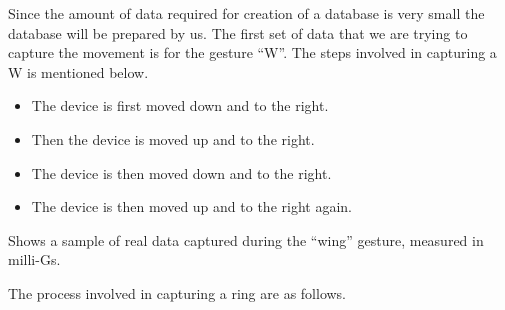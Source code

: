 Since the amount of data required for creation of a database is very small the database will be prepared by us. The first set of data that we are trying to capture the movement is for the gesture ``W''. The steps involved in capturing a W is mentioned below. \cite{Warden:2020}
\vspace{5mm}
\begin{center}
\end{center}
\begin{itemize}
    \item The device is first moved down and to the right.
    \item Then the device is moved up and to the right.
    \item The device is then moved down and to the right.
    \item  The device is then moved up and to the right again. 
    
\end{itemize}

Shows a sample of real data captured during the ``wing'' gesture, measured in milli-Gs.  

The process involved in capturing a ring are as follows. \cite{Warden:2020}


\begin{center}
\end{center}

